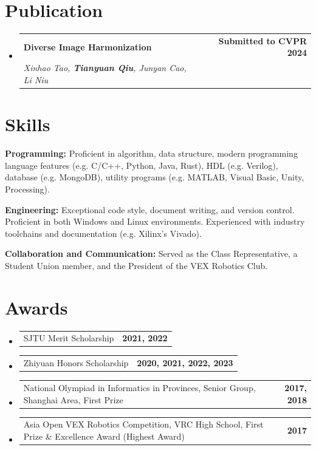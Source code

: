 \documentclass[letterpaper,11pt]{article}
\makeatletter
\newcommand{\resumeSubheading}[4]{
  \vspace{-2pt}\item
    \begin{tabular*}{1.0\textwidth}[t]{l@{\extracolsep{\fill}}r}
      \textbf{#1} & \textbf{\small #2} \\
      \textit{\small#3} & \textit{\small #4} \\
    \end{tabular*}\vspace{-7pt}
}
\newcommand{\resumeProjectHeading}[2]{
    \item
    \begin{tabular*}{1.001\textwidth}{l@{\extracolsep{\fill}}r}
      \small#1 & \textbf{\small #2}\\
    \end{tabular*}\vspace{-5pt}
}
\newcommand{\resumeSubHeadingListStart}{\begin{itemize}[leftmargin=0.0in, label={}]}
\newcommand{\resumeSubHeadingListEnd}{\end{itemize}}
\newcommand{\grayunderline}[1]{\setulcolor{lightgray}\setul{0.5ex}{0.1pt}\ul{#1}}
\makeatother
\begin{document}
\section{Publication}
    \resumeSubHeadingListStart
    \resumeSubheading
        {Diverse Image Harmonization}{Submitted to CVPR 2024}
        {Xinhao Tao, \textbf{Tianyuan Qiu}, Junyan Cao, Li Niu}{}
    \vspace{0pt}
    \resumeSubHeadingListEnd


\section{Skills}
\begin{itemize}[leftmargin=0in, label={}, itemsep=4pt]
\small{
    \item{\textbf{Programming: }{Proficient in algorithm, data structure, modern programming language features (e.g. C/C++, Python, Java, Rust), HDL (e.g. Verilog), database (e.g. MongoDB), utility programs (e.g. MATLAB, Visual Basic, Unity, Processing).}}
    \item{\textbf{Engineering: }{Exceptional code style, document writing, and version control. Proficient in both Windows and Linux environments. Experienced with industry toolchains and documentation (e.g. Xilinx's Vivado).}}
    \item{\textbf{Collaboration and Communication: }{Served as the Class Representative, a Student Union member, and the President of the VEX Robotics Club.}}
}
\end{itemize}


\section{Awards}
    \resumeSubHeadingListStart
        \resumeProjectHeading{SJTU Merit Scholarship}{2021, 2022}
        \vspace{-17pt}
        \resumeProjectHeading{Zhiyuan Honors Scholarship}{2020, 2021, 2022, 2023}
        \vspace{-17pt}
        \resumeProjectHeading{National Olympiad in Informatics in Provinces, Senior Group, Shanghai Area, First Prize}{2017, 2018}
        \vspace{-17pt}
        \resumeProjectHeading{Asia Open VEX Robotics Competition, VRC High School, First Prize \& Excellence Award (Highest Award)}{2017}
    \resumeSubHeadingListEnd
\end{document}
